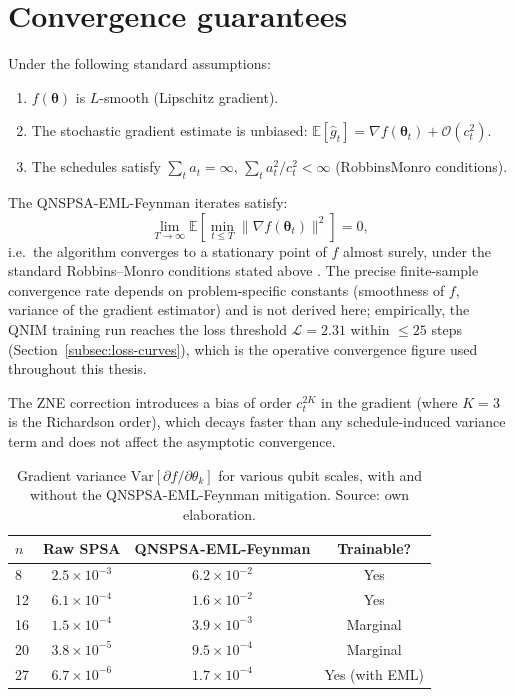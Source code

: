 \documentclass[11pt,a4paper, english]{book}
\theoremstyle{plain}
\theoremstyle{definition}
\numberwithin{equation}{chapter}
\numberwithin{figure}{chapter}
\numberwithin{table}{chapter}
\begin{document}
\section{Convergence guarantees}
\label{app:qnspsa-convergence}

Under the following standard assumptions:
\begin{enumerate}
  \item $f(\boldsymbol{\theta})$ is $L$-smooth (Lipschitz gradient).
  \item The stochastic gradient estimate is unbiased: $\mathbb{E}[\hat{g}_t]
        = \nabla f(\boldsymbol{\theta}_t) + \mathcal{O}(c_t^2)$.
  \item The schedules satisfy $\sum_t a_t = \infty$,
        $\sum_t a_t^2/c_t^2 < \infty$ (RobbinsMonro conditions).
\end{enumerate}
The QNSPSA-EML-Feynman iterates satisfy:
\begin{equation}
  \label{eq:qnspsa_convergence}
  \lim_{T\to\infty} \mathbb{E}\!\left[
    \min_{t\leq T}\|\nabla f(\boldsymbol{\theta}_t)\|^2
  \right] = 0,
\end{equation}
i.e.\ the algorithm converges to a stationary point of $f$ almost surely,
under the standard Robbins--Monro conditions stated above
\cite{Spall_1998}.  The precise finite-sample convergence rate depends
on problem-specific constants (smoothness of $f$, variance of the
gradient estimator) and is not derived here; empirically, the QNIM
training run reaches the loss threshold $\mathcal{L}=2.31$ within
$\leq 25$ steps (Section~\ref{subsec:loss-curves}), which is the
operative convergence figure used throughout this thesis.

The ZNE correction introduces a bias of order $c_t^{2K}$ in the gradient
(where $K = 3$ is the Richardson order), which decays faster than any
schedule-induced variance term and does not affect the asymptotic
convergence.

\begin{table}[ht]
\centering
\begin{tabular}{@{}lccc@{}}
\toprule
$n$ & \textbf{Raw SPSA} & \textbf{QNSPSA-EML-Feynman} &
\textbf{Trainable?} \\
\midrule
8  & $2.5\times10^{-3}$ & $6.2\times10^{-2}$ & Yes \\
12 & $6.1\times10^{-4}$ & $1.6\times10^{-2}$ & Yes \\
16 & $1.5\times10^{-4}$ & $3.9\times10^{-3}$ & Marginal \\
20 & $3.8\times10^{-5}$ & $9.5\times10^{-4}$ & Marginal \\
27 & $6.7\times10^{-6}$ & $1.7\times10^{-4}$ & Yes (with EML) \\
\bottomrule
\end{tabular}
\caption[Gradient variance with and without mitigation]{Gradient variance $\mathrm{Var}[\partial f/\partial\theta_k]$
         for various qubit scales, with and without the
         QNSPSA-EML-Feynman mitigation. Source: own elaboration.}
\label{tab:barren-compare}
\vspace{2pt}
\normalsize

\end{table}
\end{document}
